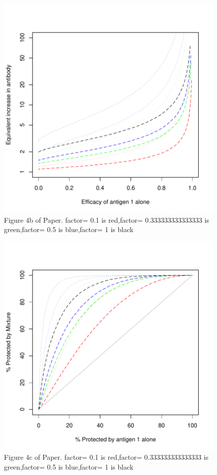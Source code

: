 \documentclass{article}[12pt]
\begin{document}
\begin{figure}
\caption{Figure 4b of Paper.
factor= 0.1  is  red,factor= 0.333333333333333  is  green,factor= 0.5  is  blue,factor= 1  is  black
 \label{fig:4b} }
\includegraphics{hbimdetails-fig4b}
\end{figure}

\begin{figure}
\caption{Figure 4c of Paper.
factor= 0.1  is  red,factor= 0.333333333333333  is  green,factor= 0.5  is  blue,factor= 1  is  black
 \label{fig:4c} }
\includegraphics{hbimdetails-fig4c}
\end{figure}
\end{document}
